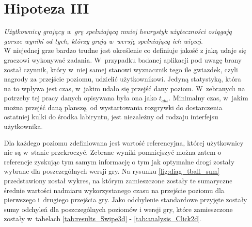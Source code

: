 \documentclass[a4paper,12pt,numbers=noenddot]{report}
\begin{document}
\section{Hipoteza III}
\textit{Użytkownicy grający w~grę spełniającą mniej heurystyk użyteczności osiągają gorsze wyniki od tych, którzy grają w~wersję spełniającą ich więcej.}\\

W niejednej grze bardzo trudne jest określenie co definiuje jakość z jaką udaje się graczowi wykonywać zadania. W~przypadku badanej aplikacji pod uwagę brany został czynnik, który w~niej samej stanowi wyznacznik tego ile gwiazdek, czyli nagrody za przejście poziomu, udzielić użytkownikowi. Jedyną statystyką, która na to wpływa jest czas, w~jakim udało się przejść dany poziom. W~zebranych na potrzeby tej pracy danych opisywana była ona jako $t_{abs}$. Minimalny czas, w~jakim można przejść daną planszę, od wystartowania rozgrywki do dostarczenia ostatniej kulki do środka labiryntu, jest niezależny od rodzaju interfejsu użytkownika. 

Dla każdego poziomu zdefiniowana jest wartość referencyjna, której użytkownicy nie są w~stanie przekroczyć. Zebrane wyniki pomniejszyć można zatem o referencje zyskując tym samym informację o tym jak optymalne drogi zostały wybrane dla poszczególnych wersji gry. Na rysunku \ref{fig:diag_tball_sum} przedstawiony został wykres, na którym zamieszczone zostały te sumaryczne średnie wartości nadmiaru wykorzystanego czasu na przejście poziomu dla pierwszego i~drugiego przejścia gry. Jako odchylenie standardowe przyjęte zostały sumy odchyleń dla poszczególnych poziomów i wersji gry, które zamieszczone zostały w~tabelach \ref{tab:results_Swipe3d} - \ref{tab:analysis_Click2d}.\\
\end{document}
